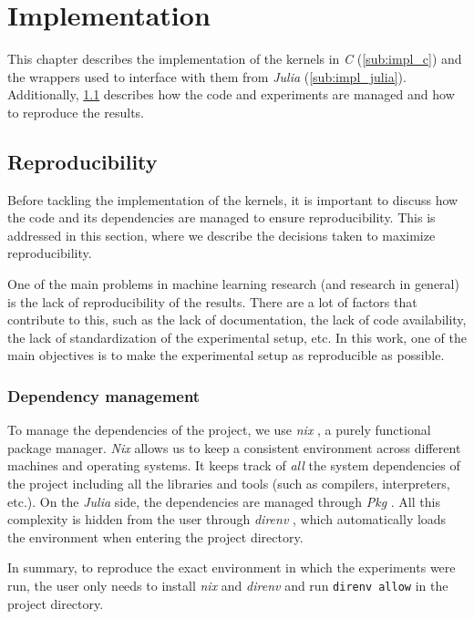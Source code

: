 \chapter{Implementation}
\label{sec:implementation}

This chapter describes the implementation of the kernels in \emph{C} (\cref{sub:impl_c}) and the wrappers
used to interface with them from \emph{Julia} (\cref{sub:impl_julia}). Additionally, \cref{sec:reproducibility}
describes how the code and experiments are managed and how to reproduce the results.

\section{Reproducibility}
\label{sec:reproducibility}

Before tackling the implementation of the kernels, it is important to discuss how the
code and its dependencies are managed to ensure reproducibility. This is addressed in
this section, where we describe the decisions taken to maximize reproducibility.

One of the main problems in machine learning research (and research in general) is the lack of
reproducibility of the results. There are a lot of factors that contribute to this, such as
the lack of documentation, the lack of code availability, the lack of standardization of
the experimental setup, etc. In this work, one of the main objectives is to make the
experimental setup as reproducible as possible.

\subsection{Dependency management}%
\label{sub:dependency_management}

To manage the dependencies of the project, we use \emph{nix} \cite{NixNixOSReproducible}, a purely
functional package manager. \emph{Nix} allows us to keep a consistent environment across different
machines and operating systems. It keeps track of \emph{all} the system dependencies of the project
including all the libraries and tools (such as compilers, interpreters, etc.).
On the \emph{Julia} side, the dependencies are managed through \emph{Pkg} \cite{PkgJuliaLanguage}.
All this complexity is hidden from the user through \emph{direnv} \cite{DirenvUnclutterYoura}, which
automatically loads the environment when entering the project directory.

In summary, to reproduce the exact environment in which the experiments were run, the user only
needs to install \emph{nix} and \emph{direnv} and run \texttt{direnv allow} in the project directory.

